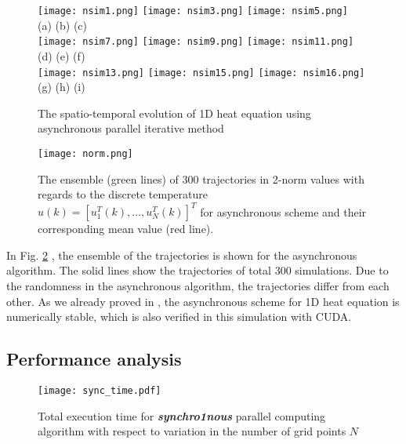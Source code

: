 \documentclass[1p]{elsarticle}
\begin{document}
\begin{figure}
\centering
\texttt{[image: nsim1.png]}
\texttt{[image: nsim3.png]}
\texttt{[image: nsim5.png]}\\
(a) \qquad\qquad\qquad\qquad\qquad\quad (b) \qquad\qquad\qquad\qquad\qquad\quad (c)\\
\texttt{[image: nsim7.png]}
\texttt{[image: nsim9.png]}
\texttt{[image: nsim11.png]}\\
(d) \qquad\qquad\qquad\qquad\qquad\quad (e) \qquad\qquad\qquad\qquad\qquad\quad (f)\\
\texttt{[image: nsim13.png]}
\texttt{[image: nsim15.png]}
\texttt{[image: nsim16.png]}\\
(g) \qquad\qquad\qquad\qquad\qquad\quad (h) \qquad\qquad\qquad\qquad\qquad\quad (i)\\
\caption{The spatio-temporal evolution of 1D heat equation using asynchronous parallel iterative method}\label{fig.2}
\vspace{0.2in}
\end{figure}
\begin{figure}
\centering
\texttt{[image: norm.png]}
\caption{The ensemble (green lines) of $300$ trajectories in 2-norm values with regards to the discrete temperature $u(k) = [u_1^{T}(k),\hdots, u_N^{T}(k)]^{T}$ for asynchronous scheme and their corresponding mean value (red line).}\label{fig.3}
\end{figure}

In Fig. \ref{fig.3} , the ensemble of the trajectories is shown for the asynchronous algorithm. The solid lines show the trajectories of total $300$ simulations. Due to the randomness in the asynchronous algorithm, the trajectories differ from each other. 
As we already proved in \citep{lee2015async}, the asynchronous scheme for 1D heat equation is numerically stable, which is also verified in this simulation with \textsf{CUDA}.


\subsection{Performance analysis}
\begin{figure}
\centering
\texttt{[image: sync\_time.pdf]}\vspace{-0.3in}
\caption{Total execution time for \textbf{\textit{synchro1nous}} parallel computing algorithm with respect to variation in the number of grid points $N$}\label{fig.4}
\end{figure}
\end{document}
